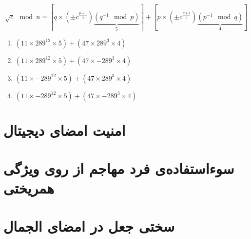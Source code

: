 \documentclass{article}
\begin{document}
\begin{latin}
\begin{equation*}
\sqrt{c} \mod n = \left[q\times(\pm c^{\frac{p+1}{4}})\underbrace{(q^{-1} \mod p)}_{5}\right] + \left[p\times(\pm c^{\frac{q+1}{4}})\underbrace{(p^{-1} \mod q)}_{4}\right]
\end{equation*}

\begin{enumerate}
\item $(11\times289^{12}\times5) + (47\times289^{3}\times4)$
\item $(11\times289^{12}\times5) + (47\times-289^{3}\times4)$
\item $(11\times-289^{12}\times5) + (47\times289^{3}\times4)$
\item $(11\times-289^{12}\times5) + (47\times-289^{3}\times4)$
\end{enumerate}
\end{latin}
\section{امنیت امضای دیجیتال }

\section{سوء‌استفاده‌ی فرد مهاجم از روی ویژگی همریختی }

\section{سختی جعل در امضای الجمال}
\end{document}
